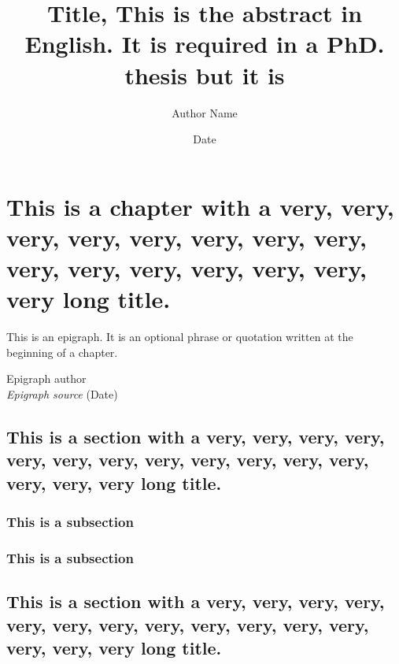 \documentclass[
documentsize = octavo, %
printmode = true, %
font = cmr, %
typesize = 10, %
fontsize = normalsize, %
onehalfspacing = false, %
language = en, %
degree = phd, %
titlelogo = udc, %
titlepage = true, %
dedication = true, %
preface = true, %
acknowledgements = true, %
abstract-en = true, %
abstract-es = true, %
abstract-ga = true, %
epigraphs = true, %
toc = true, %
lof = true, %
lot = true, %
notation = true, %
biblatex-globalbib = true, %
biblatex-chapterbib = true, %
frontmatterintoc = true, %
printby = true, %
debug = false, %
draft = false, %
showlayout = false, %
]{UDCthesis}
\title{Title, This is the abstract in English. It is required in a PhD. thesis but it is}
\author{Author Name}
\date{Date}
\begin{document}

\chapter{This is a chapter with a very, very, very, very, very, very, very, very, very, very, very, very, very, very, very long title.}
\epigraph{This is an epigraph. It is an optional phrase or quotation written at the beginning of a chapter.}{Epigraph author \\\textit{Epigraph source} (Date)}

\section{This is a section with a very, very, very, very, very, very, very, very, very, very, very, very, very, very, very long title.}

\subsection{This is a subsection}
\subsection{This is a subsection}

\section{This is a section with a very, very, very, very, very, very, very, very, very, very, very, very, very, very, very long title.}


\end{document}
